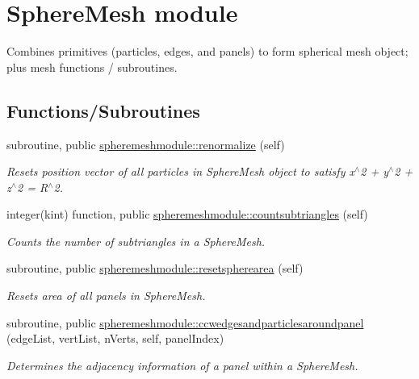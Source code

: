 \hypertarget{group__SphereMesh}{\section{Sphere\+Mesh module}
\label{group__SphereMesh}
}


Combines primitives (particles, edges, and panels) to form spherical mesh object; plus mesh functions / subroutines.  


\subsection*{Functions/\+Subroutines}
\begin{DoxyCompactItemize}
\item 
subroutine, public \hyperlink{group__SphereMesh_ga7e822ca8c1c2f3dbb84c1677b73b01d8}{spheremeshmodule\+::renormalize} (self)
\begin{DoxyCompactList}\small\item\em Resets position vector of all particles in Sphere\+Mesh object to satisfy x$^\wedge$2 + y$^\wedge$2 + z$^\wedge$2 = R$^\wedge$2. \end{DoxyCompactList}\item 
integer(kint) function, public \hyperlink{group__SphereMesh_ga7e2d1d284ff59b890c4e2cbe2bc7106c}{spheremeshmodule\+::countsubtriangles} (self)
\begin{DoxyCompactList}\small\item\em Counts the number of subtriangles in a Sphere\+Mesh. \end{DoxyCompactList}\item 
subroutine, public \hyperlink{group__SphereMesh_ga8a8a47063a070aa34913a6ecffd90e62}{spheremeshmodule\+::resetspherearea} (self)
\begin{DoxyCompactList}\small\item\em Resets area of all panels in Sphere\+Mesh. \end{DoxyCompactList}\item 
subroutine, public \hyperlink{group__SphereMesh_ga05c2ef27a6cef4f07bacbeae15d7a290}{spheremeshmodule\+::ccwedgesandparticlesaroundpanel} (edge\+List, vert\+List, n\+Verts, self, panel\+Index)
\begin{DoxyCompactList}\small\item\em Determines the adjacency information of a panel within a Sphere\+Mesh. \end{DoxyCompactList}\item 

\end{DoxyCompactItemize}
